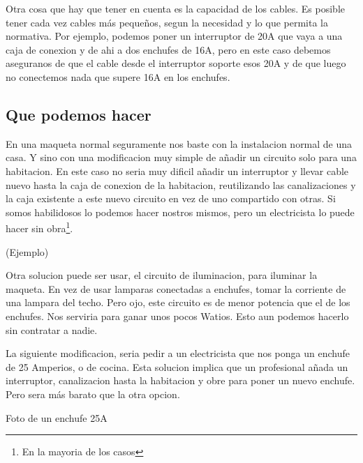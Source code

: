 Otra cosa que hay que tener en cuenta es la capacidad de los cables. Es posible tener cada vez cables más pequeños, segun la necesidad y lo que permita la normativa. Por ejemplo, podemos poner un interruptor de 20A que vaya a una caja de conexion y de ahi a dos enchufes de 16A, pero en este caso debemos aseguranos de que el cable desde el interruptor soporte esos 20A y de que luego no conectemos nada que supere 16A en los enchufes.

\subsection{Que podemos hacer}
En una maqueta normal seguramente nos baste con la instalacion normal de una casa. Y sino con una modificacion muy simple de añadir un circuito solo para una habitacion. En este caso no seria muy dificil añadir un interruptor y llevar cable nuevo hasta la caja de conexion de la habitacion, reutilizando las canalizaciones y la caja existente a este nuevo circuito en vez de uno compartido con otras. Si somos habilidosos lo podemos hacer nostros mismos, pero un electricista lo puede hacer sin obra\footnote{En la mayoria de los casos}.

(Ejemplo)

Otra solucion puede ser usar, el circuito de iluminacion, para iluminar la maqueta. En vez de usar lamparas conectadas a enchufes, tomar la corriente de una lampara del techo. Pero ojo, este circuito es de menor potencia que el de los enchufes. Nos serviria para ganar unos pocos Watios. Esto aun podemos hacerlo sin contratar a nadie.

La siguiente modificacion, seria pedir a un electricista que nos ponga un enchufe de 25 Amperios, o de cocina. Esta solucion implica que un profesional añada un interruptor, canalizacion hasta la habitacion y obre para poner un nuevo enchufe. Pero sera más barato que la otra opcion.

Foto de un enchufe 25A

